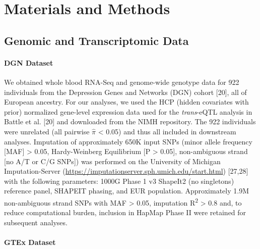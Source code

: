 \documentclass[10pt,letterpaper]{article}
\begin{document}
\section*{Materials and Methods}
\subsection*{Genomic and Transcriptomic
Data}\label{genomic-and-transcriptomic-data}

\paragraph*{DGN Dataset}\label{dgn-dataset}

We obtained whole blood RNA-Seq and genome-wide genotype data for 922
individuals from the Depression Genes and Networks (DGN) cohort
{[}20{]}, all of European ancestry. For our analyses, we used the HCP
(hidden covariates with prior) normalized gene-level expression data
used for the \emph{trans}-eQTL analysis in Battle et al. {[}20{]} and
downloaded from the NIMH repository. The 922 individuals were unrelated
(all pairwise \(\hat{\pi}\) \textless{} 0.05) and thus all included in
downstream analyses. Imputation of approximately 650K input SNPs (minor
allele frequency {[}MAF{]} \textgreater{} 0.05, Hardy-Weinberg
Equilibrium {[}P \textgreater{} 0.05{]}, non-ambiguous strand {[}no A/T
or C/G SNPs{]}) was performed on the University of Michigan
Imputation-Server
(\url{https://imputationserver.sph.umich.edu/start.html}) {[}27,28{]}
with the following parameters: 1000G Phase 1 v3 ShapeIt2 (no singletons)
reference panel, SHAPEIT phasing, and EUR population. Approximately 1.9M
non-ambiguous strand SNPs with MAF \textgreater{} 0.05, imputation
R\textsuperscript{2} \textgreater{} 0.8 and, to reduce computational
burden, inclusion in HapMap Phase II were retained for subsequent
analyses.

\paragraph*{GTEx Dataset}\label{gtex-dataset}
\end{document}
